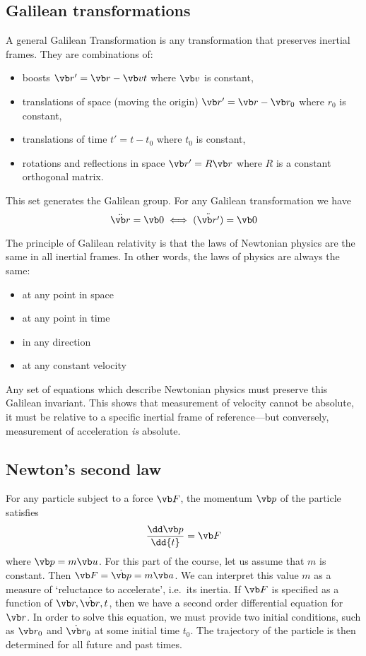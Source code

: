 \subsection{Galilean transformations}
A general Galilean Transformation is any transformation that preserves inertial frames.
They are combinations of:
\begin{itemize}
	\item boosts \(\vb r' = \vb r - \vb vt\) where \(\vb v\) is constant,
	\item translations of space (moving the origin) \(\vb r' = \vb r - \vb r_0\) where \(r_0\) is constant,
	\item translations of time \(t' = t - t_0\) where \(t_0\) is constant,
	\item rotations and reflections in space \(\vb r' = R \vb r\) where \(R\) is a constant orthogonal matrix.
\end{itemize}
This set generates the Galilean group.
For any Galilean transformation we have
\[
	\ddot{\vb r} = \vb 0 \iff \ddot{(\vb r')} = \vb 0
\]

The principle of Galilean relativity is that the laws of Newtonian physics are the same in all inertial frames.
In other words, the laws of physics are always the same:
\begin{itemize}
	\item at any point in space
	\item at any point in time
	\item in any direction
	\item at any constant velocity
\end{itemize}
Any set of equations which describe Newtonian physics must preserve this Galilean invariant.
This shows that measurement of velocity cannot be absolute, it must be relative to a specific inertial frame of reference---but conversely, measurement of acceleration \textit{is} absolute.

\subsection{Newton's second law}
For any particle subject to a force \(\vb F\), the momentum \(\vb p\) of the particle satisfies
\[
	\frac{\dd \vb p}{\dd{t}} = \vb F
\]
where \(\vb p = m \vb u\).
For this part of the course, let us assume that \(m\) is constant.
Then \(\vb F = \dot{\vb p} = m \vb a\).
We can interpret this value \(m\) as a measure of `reluctance to accelerate', i.e.\ its inertia.
If \(\vb F\) is specified as a function of \(\vb r, \dot{\vb r}, t\), then we have a second order differential equation for \(\vb r\).
In order to solve this equation, we must provide two initial conditions, such as \(\vb r_0\) and \(\dot{\vb r}_0\) at some initial time \(t_0\).
The trajectory of the particle is then determined for all future and past times.

